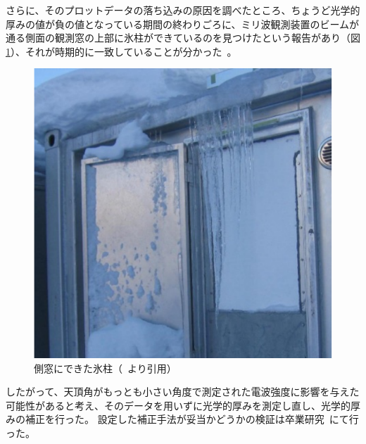 さらに、そのプロットデータの落ち込みの原因を調べたところ、ちょうど光学的厚みの値が負の値となっている期間の終わりごろに、ミリ波観測装置のビームが通る側面の観測窓の上部に氷柱ができているのを見つけたという報告があり（図\ref{fig:icicles}）、それが時期的に一致していることが分かった~\cite{goto2021bachelor}。
\begin{figure}[htbp]
    \centering
    \includegraphics[width=\linewidth]{master_thesis_contents/master_thesis_fig/icicles.pdf}
    \caption{側窓にできた氷柱（~\cite{goto2021bachelor}より引用）}
    \label{fig:icicles}
\end{figure}
したがって、天頂角がもっとも小さい角度で測定された電波強度に影響を与えた可能性があると考え、そのデータを用いずに光学的厚みを測定し直し、光学的厚みの補正を行った。
設定した補正手法が妥当かどうかの検証は卒業研究~\cite{goto2021bachelor}にて行った。

